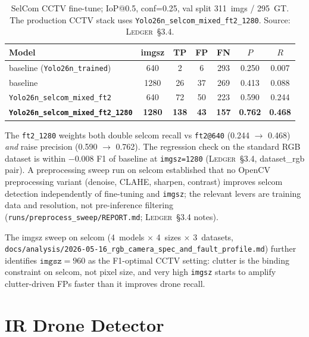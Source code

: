 \documentclass[12pt,a4paper,oneside,openright]{book}
\begin{document}
\begin{table}[htbp]
    \centering
    \caption{SelCom CCTV fine-tune; IoP@0.5, conf=0.25, val split 311~imgs / 295~GT. The production CCTV stack uses \texttt{Yolo26n\_selcom\_mixed\_ft2\_1280}. Source: \textsc{Ledger}~\S3.4.}
    \label{tab:selcom}
    \begin{tabular}{lcccccc}
        \toprule
        Model & imgsz & TP & FP & FN & $P$ & $R$ \\
        \midrule
        baseline (\texttt{Yolo26n\_trained})        & 640  &   2 &  6 & 293 & 0.250 & 0.007 \\
        baseline                                    & 1280 &  26 & 37 & 269 & 0.413 & 0.088 \\
        \texttt{Yolo26n\_selcom\_mixed\_ft2}        & 640  &  72 & 50 & 223 & 0.590 & 0.244 \\
        \textbf{\texttt{Yolo26n\_selcom\_mixed\_ft2\_1280}} & \textbf{1280} & \textbf{138} & \textbf{43} & \textbf{157} & \textbf{0.762} & \textbf{0.468} \\
        \bottomrule
    \end{tabular}
\end{table}

The \texttt{ft2\_1280} weights both double selcom recall vs \texttt{ft2@640} (0.244 $\to$ 0.468) \emph{and} raise precision (0.590 $\to$ 0.762). The regression check on the standard RGB dataset is within $-0.008$ F1 of baseline at \texttt{imgsz=1280} (\textsc{Ledger}~\S3.4, dataset\_rgb pair). A preprocessing sweep run on selcom established that no OpenCV preprocessing variant (denoise, CLAHE, sharpen, contrast) improves selcom detection independently of fine-tuning and \texttt{imgsz}; the relevant levers are training data and resolution, not pre-inference filtering (\texttt{runs/preprocess\_sweep/REPORT.md}; \textsc{Ledger}~\S3.4 notes).

The imgsz sweep on selcom (4~models $\times$ 4~sizes $\times$ 3~datasets, \texttt{docs/analysis/2026-05-16\_rgb\_camera\_spec\_and\_fault\_profile.md}) further identifies $\mathtt{imgsz}=960$ as the F1-optimal CCTV setting: clutter is the binding constraint on selcom, not pixel size, and very high \texttt{imgsz} starts to amplify clutter-driven FPs faster than it improves drone recall.

\section{IR Drone Detector}
\label{sec:ir_detector}
\end{document}
